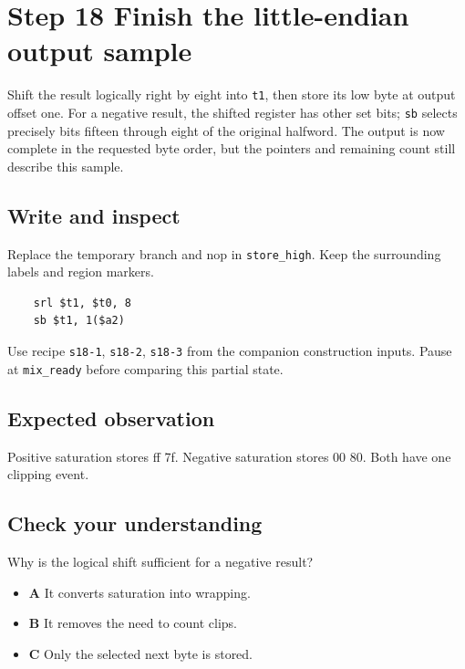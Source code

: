 \section{Step 18 Finish the little-endian output sample}\label{pcm-s18}

Shift the result logically right by eight into \texttt{t1}, then store its low byte at output offset one. For a negative result, the shifted register has other set bits; \texttt{sb} selects precisely bits fifteen through eight of the original halfword. The output is now complete in the requested byte order, but the pointers and remaining count still describe this sample.

\subsection{Write and inspect}
Replace the temporary branch and nop in \texttt{store\_high}. Keep the surrounding labels and region markers.

\begin{verbatim}
    srl $t1, $t0, 8
    sb $t1, 1($a2)
\end{verbatim}
Use recipe \texttt{s18-1}, \texttt{s18-2}, \texttt{s18-3} from the companion construction inputs. Pause at \texttt{mix\_ready} before comparing this partial state.

\subsection{Expected observation}
Positive saturation stores ff 7f. Negative saturation stores 00 80. Both have one clipping event.

\subsection{Check your understanding}
Why is the logical shift sufficient for a negative result?

\begin{itemize}
\item \textbf{A} It converts saturation into wrapping.
\item \textbf{B} It removes the need to count clips.
\item \textbf{C} Only the selected next byte is stored.
\end{itemize}
